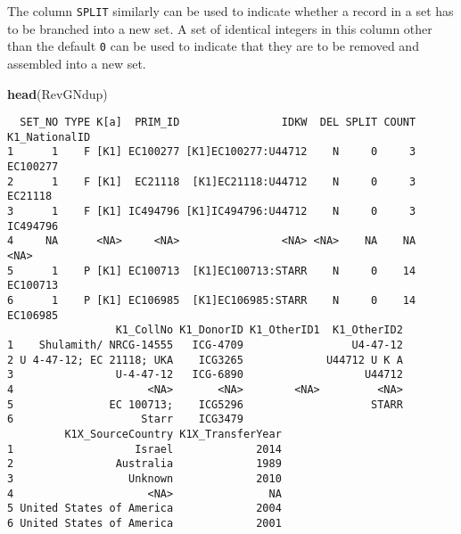 \documentclass[
]{article}
\newenvironment{Shaded}{\begin{snugshade}}{\end{snugshade}}
\newcommand{\CommentTok}[1]{\textcolor[rgb]{0.56,0.35,0.01}{\textit{#1}}}
\newcommand{\DataTypeTok}[1]{\textcolor[rgb]{0.13,0.29,0.53}{#1}}
\newcommand{\DecValTok}[1]{\textcolor[rgb]{0.00,0.00,0.81}{#1}}
\newcommand{\KeywordTok}[1]{\textcolor[rgb]{0.13,0.29,0.53}{\textbf{#1}}}
\newcommand{\NormalTok}[1]{#1}
\newcommand{\OperatorTok}[1]{\textcolor[rgb]{0.81,0.36,0.00}{\textbf{#1}}}
\newcommand{\OtherTok}[1]{\textcolor[rgb]{0.56,0.35,0.01}{#1}}
\newcommand{\StringTok}[1]{\textcolor[rgb]{0.31,0.60,0.02}{#1}}
\begin{document}
The column \texttt{SPLIT} similarly can be used to indicate whether a
record in a set has to be branched into a new set. A set of identical
integers in this column other than the default \texttt{0} can be used to
indicate that they are to be removed and assembled into a new set.

\begin{Shaded}
\end{Shaded}

\begin{Shaded}
\begin{Highlighting}[]
\KeywordTok{head}\NormalTok{(RevGNdup)}
\end{Highlighting}
\end{Shaded}

\begin{verbatim}
  SET_NO TYPE K[a]  PRIM_ID                IDKW  DEL SPLIT COUNT K1_NationalID
1      1    F [K1] EC100277 [K1]EC100277:U44712    N     0     3      EC100277
2      1    F [K1]  EC21118  [K1]EC21118:U44712    N     0     3       EC21118
3      1    F [K1] IC494796 [K1]IC494796:U44712    N     0     3      IC494796
4     NA      <NA>     <NA>                <NA> <NA>    NA    NA          <NA>
5      1    P [K1] EC100713  [K1]EC100713:STARR    N     0    14      EC100713
6      1    P [K1] EC106985  [K1]EC106985:STARR    N     0    14      EC106985
                 K1_CollNo K1_DonorID K1_OtherID1  K1_OtherID2
1    Shulamith/ NRCG-14555   ICG-4709                 U4-47-12
2 U 4-47-12; EC 21118; UKA    ICG3265             U44712 U K A
3                U-4-47-12   ICG-6890                   U44712
4                     <NA>       <NA>        <NA>         <NA>
5               EC 100713;    ICG5296                    STARR
6                    Starr    ICG3479                         
         K1X_SourceCountry K1X_TransferYear
1                   Israel             2014
2                Australia             1989
3                  Unknown             2010
4                     <NA>               NA
5 United States of America             2004
6 United States of America             2001
\end{verbatim}
\end{document}

